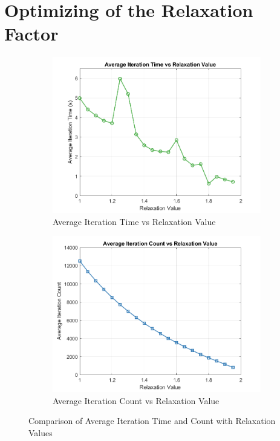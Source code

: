 \section{Optimizing of the Relaxation Factor}
\label{Sec: Optimizing Relaxation Factor}

\usepackage{graphicx}   %
\usepackage{subcaption} %

\begin{figure}[H]
    \centering
    \begin{subfigure}[b]{0.55\linewidth}
        \centering
        \includegraphics[width=\linewidth]{figures/overrelaxation/average_iteration_time_vs_relaxation_value.png}
        \caption{Average Iteration Time vs Relaxation Value}
        \label{fig:average_iteration_time}
    \end{subfigure}
    \hfill
    \begin{subfigure}[b]{0.55\linewidth}
        \centering
        \includegraphics[width=\linewidth]{figures/overrelaxation/average_iteration_count_vs_relaxation_value.png}
        \caption{Average Iteration Count vs Relaxation Value}
        \label{fig:average_iteration_count}
    \end{subfigure}
    \caption{Comparison of Average Iteration Time and Count with Relaxation Values}
    \label{fig:comparison}
\end{figure}
